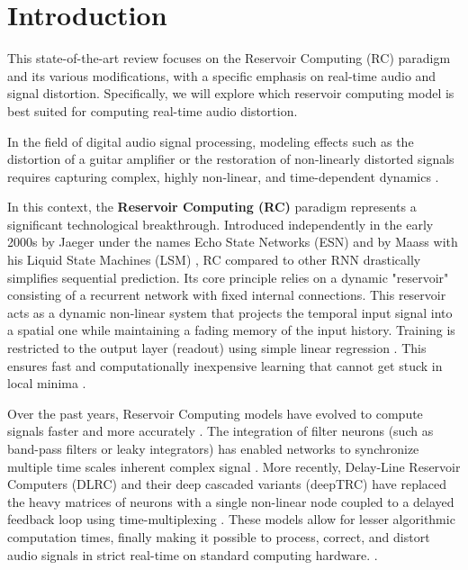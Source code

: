 
\section{Introduction}

This state-of-the-art review focuses on the Reservoir Computing (RC) paradigm and its various modifications, with a specific emphasis on real-time audio and signal distortion. Specifically, we will explore which reservoir computing model is best suited for computing real-time audio distortion.

\vspace{0.5cm}

In the field of digital audio signal processing, modeling effects such as the distortion of a guitar amplifier or the restoration of non-linearly distorted signals requires capturing complex, highly non-linear, and time-dependent dynamics \cite{Keuninckx2017RealTime}.

\vspace{0.5cm}

In this context, the \textbf{Reservoir Computing (RC)} paradigm represents a significant technological breakthrough. Introduced independently in the early 2000s by Jaeger under the names Echo State Networks (ESN) \cite{Jaeger10ESN} and  by Maass with his Liquid State Machines (LSM) \cite{maass2002realtime}, RC compared to other RNN drastically simplifies sequential prediction. Its core principle relies on a dynamic "reservoir" consisting of a recurrent network with fixed internal connections. This reservoir acts as a dynamic non-linear system that projects the temporal input signal into a spatial one while maintaining a fading memory of the input history. Training is restricted to the output layer (readout) using simple linear regression \cite{Jaeger10ESN}. This ensures fast and computationally inexpensive learning that cannot get stuck in local minima \cite{Keuninckx2017RealTime}.

\vspace{0.5cm}

Over the past years, Reservoir Computing models have evolved to compute signals faster and more accurately \cite{goldmann2020deep, holzmann2009reservoir, Appeltant2011Information}. The integration of filter neurons (such as band-pass filters or leaky integrators) \cite{Jaeger10ESN, wyffels2008band} has enabled networks to synchronize multiple time scales inherent complex signal \cite{Jaeger10ESN, wyffels2008band}. More recently, Delay-Line Reservoir Computers (DLRC) \cite{Keuninckx2017RealTime} and their deep cascaded variants (deepTRC) \cite{goldmann2020deep} have replaced the heavy matrices of neurons with a single non-linear node coupled to a delayed feedback loop using time-multiplexing \cite{holzmann2009reservoir}. These models allow for lesser algorithmic computation times, finally making it possible to process, correct, and distort audio signals in strict real-time on standard computing hardware. \cite{Keuninckx2017RealTime}.

